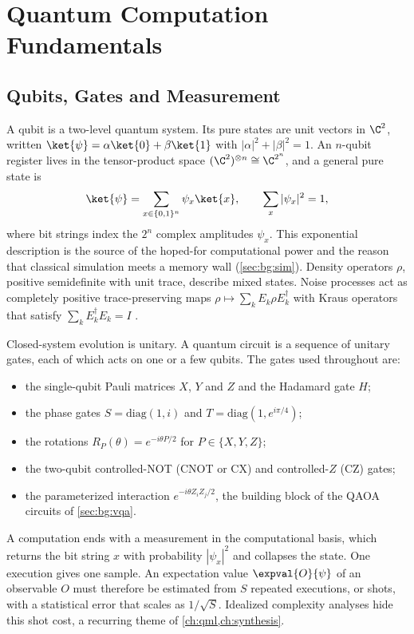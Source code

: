 \section{Quantum Computation Fundamentals}\label{sec:bg:qc}

\subsection{Qubits, Gates and Measurement}

A qubit is a two-level quantum system. Its pure states are unit vectors in $\C^2$, written $\ket{\psi}=\alpha\ket{0}+\beta\ket{1}$ with $|\alpha|^2+|\beta|^2=1$. An $n$-qubit register lives in the tensor-product space $(\C^2)^{\otimes n}\cong\C^{2^n}$, and a general pure state is
\begin{equation}\label{eq:bg:statevector}
\ket{\psi}=\sum_{x\in\{0,1\}^n}\psi_x\ket{x},\qquad \sum_{x}|\psi_x|^2=1,
\end{equation}
where bit strings index the $2^n$ complex amplitudes $\psi_x$. This exponential description is the source of the hoped-for computational power and the reason that classical simulation meets a memory wall (\cref{sec:bg:sim}). Density operators $\rho$, positive semidefinite with unit trace, describe mixed states. Noise processes act as completely positive trace-preserving maps $\rho\mapsto\sum_k E_k\rho E_k^\dagger$ with Kraus operators that satisfy $\sum_k E_k^\dagger E_k=I$ \cite{nielsen2010qcqi}.

Closed-system evolution is unitary. A quantum circuit is a sequence of unitary gates, each of which acts on one or a few qubits. The gates used throughout are:
\begin{itemize}
\item the single-qubit Pauli matrices $X$, $Y$ and $Z$ and the Hadamard gate $H$;
\item the phase gates $S=\mathrm{diag}(1,i)$ and $T=\mathrm{diag}(1,e^{i\pi/4})$;
\item the rotations $R_P(\theta)=e^{-i\theta P/2}$ for $P\in\{X,Y,Z\}$;
\item the two-qubit controlled-NOT (CNOT or CX) and controlled-$Z$ (CZ) gates;
\item the parameterized interaction $e^{-i\theta Z_iZ_j/2}$, the building block of the QAOA circuits of \cref{sec:bg:vqa}.
\end{itemize}
A computation ends with a measurement in the computational basis, which returns the bit string $x$ with probability $|\psi_x|^2$ and collapses the state. One execution gives one sample. An expectation value $\expval{O}{\psi}$ of an observable $O$ must therefore be estimated from $S$ repeated executions, or shots, with a statistical error that scales as $1/\sqrt{S}$. Idealized complexity analyses hide this shot cost, a recurring theme of \cref{ch:qml,ch:synthesis}.

